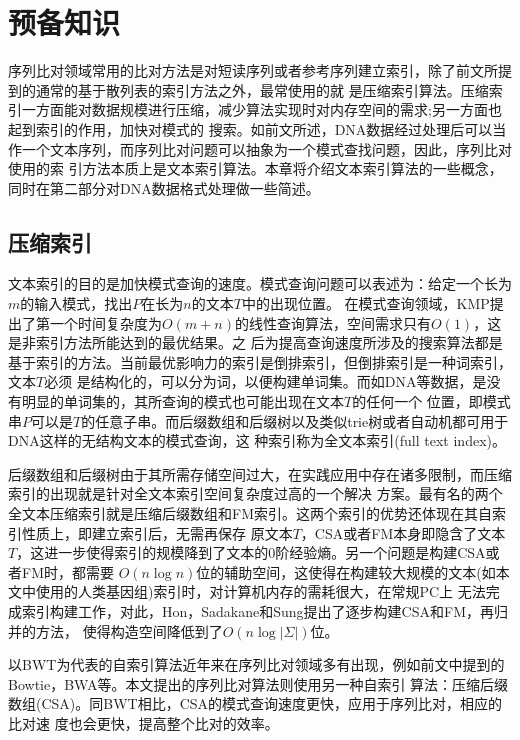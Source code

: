 \chapter{预备知识}
\label{chap:predefine}
序列比对领域常用的比对方法是对短读序列或者参考序列建立索引，除了前文所提到的通常的基于散列表的索引方法之外，最常使用的就
是压缩索引算法。压缩索引一方面能对数据规模进行压缩，减少算法实现时对内存空间的需求;另一方面也起到索引的作用，加快对模式的
搜索。如前文所述，DNA数据经过处理后可以当作一个文本序列，而序列比对问题可以抽象为一个模式查找问题，因此，序列比对使用的索
引方法本质上是文本索引算法。本章将介绍文本索引算法的一些概念，同时在第二部分对DNA数据格式处理做一些简述。

\section{压缩索引}
文本索引的目的是加快模式查询的速度。模式查询问题可以表述为：给定一个长为$m$的输入模式，找出$P$在长为$n$的文本$T$中的出现位置。
在模式查询领域，KMP提出了第一个时间复杂度为$O(m+n)$的线性查询算法，空间需求只有$O(1)$，这是非索引方法所能达到的最优结果。之
后为提高查询速度所涉及的搜索算法都是基于索引的方法。当前最优影响力的索引是倒排索引，但倒排索引是一种词索引，文本$T$必须
是结构化的，可以分为词，以便构建单词集。而如DNA等数据，是没有明显的单词集的，其所查询的模式也可能出现在文本$T$的任何一个
位置，即模式串$P$可以是$T$的任意子串。而后缀数组和后缀树以及类似trie树或者自动机都可用于DNA这样的无结构文本的模式查询，这
种索引称为全文本索引(full text index)。

后缀数组和后缀树由于其所需存储空间过大，在实践应用中存在诸多限制，而压缩索引的出现就是针对全文本索引空间复杂度过高的一个解决
方案。最有名的两个全文本压缩索引就是压缩后缀数组和FM索引。这两个索引的优势还体现在其自索引性质上，即建立索引后，无需再保存
原文本$T$，CSA或者FM本身即隐含了文本$T$，这进一步使得索引的规模降到了文本的0阶经验熵。另一个问题是构建CSA或者FM时，都需要
$O(n\log n)$位的辅助空间，这使得在构建较大规模的文本(如本文中使用的人类基因组)索引时，对计算机内存的需耗很大，在常规PC上
无法完成索引构建工作，对此，Hon，Sadakane和Sung提出了逐步构建CSA和FM，再归并的方法\cite{lam2002space}\cite{hon2003constructing}，
使得构造空间降低到了$O(n\log |\Sigma|)$位。

以BWT为代表的自索引算法近年来在序列比对领域多有出现，例如前文中提到的Bowtie，BWA等。本文提出的序列比对算法则使用另一种自索引
算法：压缩后缀数组(CSA)\cite{grossi2005compressed}。同BWT相比，CSA的模式查询速度更快，应用于序列比对，相应的比对速
度也会更快，提高整个比对的效率。

